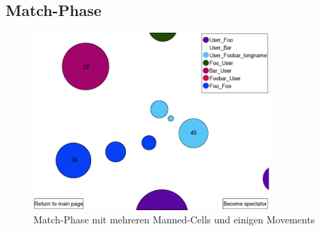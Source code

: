 \subsection{Match-Phase}
\begin{figure}[H]
    \centering
    \includegraphics[width=0.8\textwidth]{match-phase.png}
    \caption{Match-Phase mit mehreren Manned-Cells und einigen Movements}
\end{figure}
